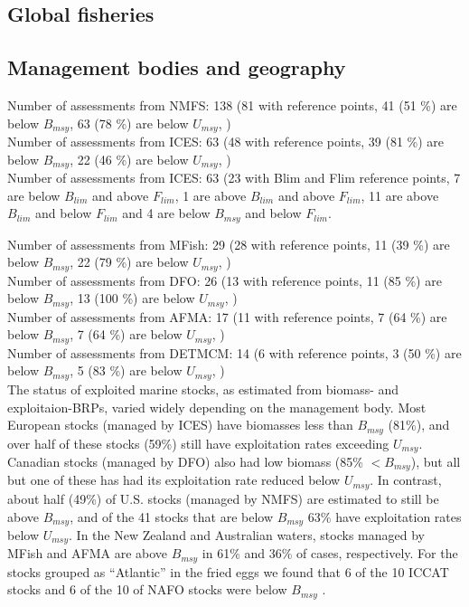 \subsection*{Global fisheries}

\subsection*{Management bodies and geography}
\noindent
Number of assessments from NMFS: 138 (81 with reference points, 41 (51 \%) are below $B_{msy}$, 63 (78 \%) are below $U_{msy}$, ) \\

Number of assessments from ICES: 63 (48 with reference points, 39 (81 \%) are below $B_{msy}$, 22 (46 \%) are below $U_{msy}$, ) \\

Number of assessments from ICES: 63 (23 with Blim and Flim reference points, 7 are below $B_{lim}$ and above $F_{lim}$, 1 are above $B_{lim}$ and above $F_{lim}$, 11 are above $B_{lim}$ and below $F_{lim}$ and 4 are below $B_{msy}$ and below $F_{lim}$.

Number of assessments from MFish: 29 (28 with reference points, 11 (39 \%) are below $B_{msy}$, 22 (79 \%) are below $U_{msy}$, ) \\
Number of assessments from DFO: 26 (13 with reference points, 11 (85 \%) are below $B_{msy}$, 13 (100 \%) are below $U_{msy}$, ) \\
Number of assessments from AFMA: 17 (11 with reference points, 7 (64 \%) are below $B_{msy}$, 7 (64 \%) are below $U_{msy}$, ) \\
Number of assessments from DETMCM: 14 (6 with reference points, 3 (50 \%) are below $B_{msy}$, 5 (83 \%) are below $U_{msy}$, ) \\

The status of exploited marine stocks, as estimated from biomass- and
exploitaion-BRPs, varied widely depending on the management body. Most European stocks (managed by
ICES) have biomasses less than $B_{msy}$
(81\%), and over half of these
stocks (59\%) still
have exploitation rates exceeding $U_{msy}$. Canadian stocks (managed
by DFO) also had low biomass (85\%
$< B_{msy}$), but all but one of these has had its exploitation rate
reduced below $U_{msy}$. In contrast, about half
(49\%) of U.S. stocks (managed by
NMFS) are estimated to still be above $B_{msy}$, and of the
41 stocks that are below $B_{msy}$
63\% have exploitation
rates below $U_{msy}$. In the New
Zealand and Australian waters, stocks managed by MFish and AFMA are
above $B_{msy}$ in 61\% and
36\% of cases, respectively. For
the stocks grouped as ``Atlantic'' in the fried eggs we
found that 6 of the
10 ICCAT stocks and
6 of the
10 of NAFO stocks were below $B_{msy}$ .

